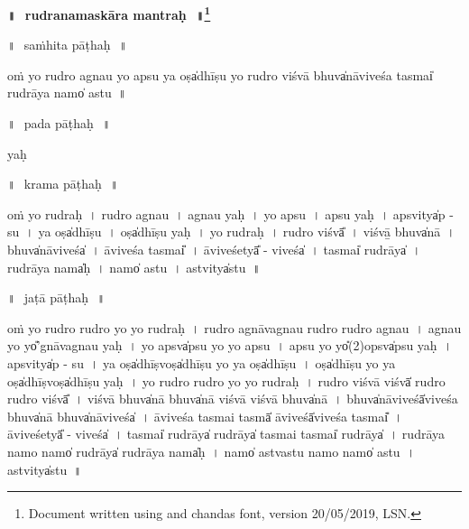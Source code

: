 \documentclass[parskip, DIV=14]{scrartcl}
\renewcommand{\thefootnote}{\fnsymbol{footnote}} %
\begin{document}

\vspace{-1.5cm}

\begin{center}
\textbf{{\Huge॥\,~rudranamaskāra mantraḥ\,~॥\LARGE\let\thefootnote\relax\footnote{\color{lightgray} Document written using \XeLaTeX{} and chandas font,  version 20/05/2019, LSN.}}}
\end{center}
\Large

{\centering	


॥\,~saṁhita pāṭhaḥ\,~॥\\
\vspace{0.5cm}

oṁ yo ru॒dro a॒gnau yo a॒psu ya
oṣa̍dhīṣu॒ yo ru॒dro viśvā॒ bhuva̍nāvi॒veśa॒ tasmai̍ ru॒drāya॒ namo̍ astu~॥

\vspace{1.0cm}

॥\,~pada pāṭhaḥ\,~॥\\
\vspace{0.5cm}

yaḥ 

\vspace{1cm}

॥\,~krama pāṭhaḥ\,~॥\\
\vspace{0.5cm}

oṁ yo ru॒draḥ~।
ru॒dro a॒gnau~।
a॒gnau yaḥ~।
yo a॒psu~।
a॒psu yaḥ~।
a॒psvitya̍p - su~।
ya oṣa̍dhīṣu~।
oṣa̍dhīṣu॒ yaḥ~।
yo ru॒draḥ~।
ru॒dro viśvā̎~।
viśvā̱ bhuva̍nā~।
bhuva̍nāvi॒veśa̍~।
ā॒vi॒veśa॒ tasmai̎~।
ā॒vi॒veśetyā̎ - vi॒veśa̍~।
tasmai̍ ru॒drāya̍~।
ru॒drāya॒ nama̍ḥ~।
namo̍ astu~।
a॒stvitya̍stu~॥

\newpage
॥\,~jaṭā pāṭhaḥ\,~॥\\
\vspace{0.5cm}

oṁ yo ru॒dro ru॒dro yo yo ru॒draḥ~।
ru॒dro a॒gnāva॒gnau ru॒dro ru॒dro a॒gnau~।
a॒gnau yo yo̎'gnāva॒gnau yaḥ~।
yo a॒psva̍psu yo yo a॒psu~।
a॒psu yo yo̎(2)o॒psva̍psu yaḥ~।
a॒psvitya̍p - su~।
ya oṣa̍dhī॒ṣvoṣa̍dhīṣu॒ yo ya oṣa̍dhīṣu~।
oṣa̍dhīṣu॒ yo ya oṣa̍dhī॒ṣvoṣa̍dhīṣu॒ yaḥ~।
yo ru॒dro ru॒dro yo yo ru॒draḥ~।
ru॒dro viśvā॒ viśvā̍ ru॒dro ru॒dro viśvā̎~।
viśvā॒ bhuva̍nā॒ bhuva̍nā॒ viśvā॒ viśvā॒ bhuva̍nā~।
bhuva̍nāvi॒veśā̍vi॒veśa॒ bhuva̍nā॒  bhuva̍nāvi॒veśa̍~।
ā॒vi॒veśa॒ tasmai॒ tasmā̍ āvi॒veśā̍vi॒veśa॒ tasmai̎~।
ā॒vi॒veśetyā̎ - vi॒veśa̍~।
tasmai̍ ru॒drāya̍ ru॒drāya̍ tasmai॒ tasmai̍ ru॒drāya̍~।
ru॒drāya॒ namo॒ namo̍ ru॒drāya̍ ru॒drāya॒ nama̍ḥ~।
namo̍ astvastu॒ namo॒ namo̍ astu~।
a॒stvitya̍stu~॥

}
\end{document}

